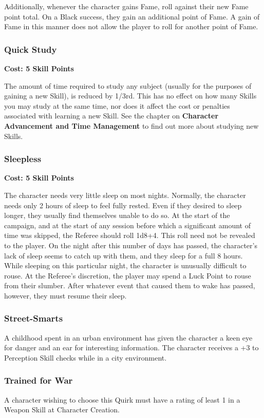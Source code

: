 \documentclass[oneside]{book}
\begin{document}
\begin{multicols}{2}
Additionally, whenever the character gains Fame, roll against their new Fame point total. On a Black success, they gain an additional point of Fame. A gain of Fame in this manner does not allow the player to roll for another point of Fame.

\subsubsection{Quick Study}
\textbf{\small Cost: 5 Skill Points}

The amount of time required to study any subject (usually for the purposes of gaining a new Skill), is reduced by 1/3rd. This has no effect on how many Skills you may study at the same time, nor does it affect the cost or penalties associated with learning a new Skill. See the chapter on \textbf{Character Advancement and Time Management} to find out more about studying new Skills.

\subsubsection{Sleepless}
\textbf{\small Cost: 5 Skill Points}

The character needs very little sleep on most nights. Normally, the character needs only 2 hours of sleep to feel fully rested. Even if they desired to sleep longer, they usually find themselves unable to do so. At the start of the campaign, and at the start of any session before which a significant amount of time was skipped, the Referee should roll 1d8+4. This roll need not be revealed to the player. On the night after this number of days has passed, the character's lack of sleep seems to catch up with them, and they sleep for a full 8 hours. While sleeping on this particular night, the character is unusually difficult to rouse. At the Referee's discretion, the player may spend a Luck Point to rouse from their slumber. After whatever event that caused them to wake has passed, however, they must resume their sleep.

\subsubsection{Street-Smarts}
A childhood spent in an urban environment has given the character a keen eye for danger and an ear for interesting information. The character receives a +3 to Perception Skill checks while in a city environment. 

\subsubsection{Trained for War}
A character wishing to choose this Quirk must have a rating of least 1 in a Weapon Skill at Character Creation.


\end{multicols}
\end{document}
